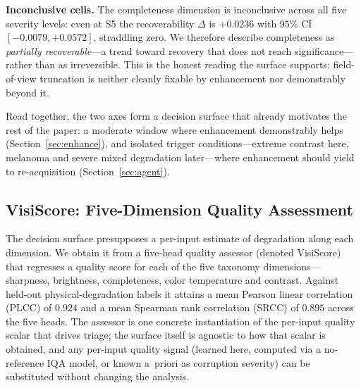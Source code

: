 \textbf{Inconclusive cells.} The completeness dimension is inconclusive across all five severity levels: even at S5 the recoverability $\Delta$ is $+0.0236$ with $95\%$ CI $[-0.0079, +0.0572]$, straddling zero. We therefore describe completeness as \emph{partially recoverable}---a trend toward recovery that does not reach significance---rather than as irreversible. This is the honest reading the surface supports: field-of-view truncation is neither cleanly fixable by enhancement nor demonstrably beyond it.

Read together, the two axes form a decision surface that already motivates the rest of the paper: a moderate window where enhancement demonstrably helps (Section~\ref{sec:enhance}), and isolated trigger conditions---extreme contrast here, melanoma and severe mixed degradation later---where enhancement should yield to re-acquisition (Section~\ref{sec:agent}).

\subsection{VisiScore: Five-Dimension Quality Assessment}
\label{sec:visiscore}

The decision surface presupposes a per-input estimate of degradation along each dimension. We obtain it from a five-head quality assessor (denoted VisiScore) that regresses a quality score for each of the five taxonomy dimensions---sharpness, brightness, completeness, color temperature and contrast. Against held-out physical-degradation labels it attains a mean Pearson linear correlation (PLCC) of $0.924$ and a mean Spearman rank correlation (SRCC) of $0.895$ across the five heads. The assessor is one concrete instantiation of the per-input quality scalar that drives triage; the surface itself is agnostic to how that scalar is obtained, and any per-input quality signal (learned here, computed via a no-reference IQA model, or known a~priori as corruption severity) can be substituted without changing the analysis.

